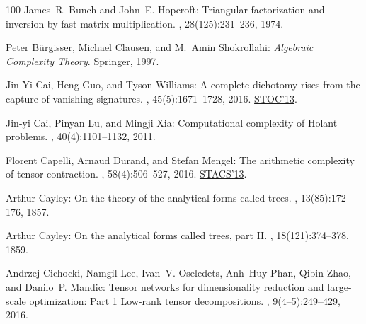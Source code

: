 \begin{thebibliography}{100}
{\sc James~R. Bunch and John~E. Hopcroft}: Triangular factorization and
  inversion by fast matrix multiplication.
, 28(125):231--236, 1974.
\newblock [\epfmtdoi{10.1090/S0025-5718-1974-0331751-8}]

{\sc Peter B{\"u}rgisser, Michael Clausen, and M.~Amin Shokrollahi}: {\em
  Algebraic Complexity Theory}.
\newblock Springer, 1997.
\newblock [\epfmtdoi{10.1007/978-3-662-03338-8}]

{\sc Jin{-}Yi Cai, Heng Guo, and Tyson Williams}: A complete dichotomy rises
  from the capture of vanishing signatures.
, 45(5):1671--1728, 2016.
\newblock \prelim \href{https://doi.org/10.1145/2488608.2488687}{STOC'13}.

{\sc Jin{-}yi Cai, Pinyan Lu, and Mingji Xia}: Computational complexity of
  {H}olant problems.
, 40(4):1101--1132, 2011.
\newblock [\epfmtdoi{10.1137/100814585}]

{\sc Florent Capelli, Arnaud Durand, and Stefan Mengel}: The arithmetic
  complexity of tensor contraction.
, 58(4):506--527, 2016.
\newblock \prelim
  \href{https://doi.org/10.4230/LIPIcs.STACS.2013.365}{STACS'13}.

{\sc Arthur Cayley}: On the theory of the analytical forms called trees.
, 13(85):172--176, 1857.
\newblock [\epfmtdoi{10.1080/14786445708642275}]

{\sc Arthur Cayley}: On the analytical forms called trees, part {II}.
, 18(121):374--378, 1859.
\newblock [\epfmtdoi{10.1080/14786445908642782}]

{\sc Andrzej Cichocki, Namgil Lee, Ivan~V. Oseledets, Anh~Huy Phan, Qibin Zhao,
  and Danilo~P. Mandic}: Tensor networks for dimensionality reduction and
  large-scale optimization: Part 1 {L}ow-rank tensor decompositions.
, 9(4--5):249--429, 2016.
\newblock [\epfmtdoi{10.1561/2200000059}]


\end{thebibliography}
